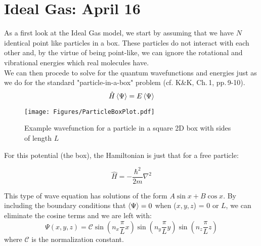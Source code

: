 \section{Ideal Gas: April 16}
As a first look at the Ideal Gas model, we start by assuming that we have $N$ identical point like particles in a box. These particles do not interact with each other and, by the virtue of being point-like, we can ignore the rotational and vibrational energies which real molecules have.\\

We can then procede to solve for the quantum wavefunctions and energies just as we do for the standard "particle-in-a-box" problem (cf. K\&K, Ch.\,1, pp.\,9-10).
\begin{equation}
\hat{H} \Braket{\Psi} = E \Braket{\Psi}
\end{equation}

\begin{figure}[h]
\centering
\texttt{[image: Figures/ParticleBoxPlot.pdf]}
\caption{Example wavefunction for a particle in a square 2D box 
	with sides of length $L$}
\end{figure}

For this potential (the box), the Hamiltonian is just that for a free 
particle:

\begin{equation}
\hat{H} = -\frac{\hbar^2}{2 m} \nabla^2
\end{equation}

This type of wave equation has solutions of the form $A \sin{x} + B \cos{x}$.
By including the boundary conditions that $\Braket{\Psi} = 0$ when
($x, y, z$) = $0$ or $L$, we can eliminate the cosine terms and we are left
with:
\begin{equation}
\Psi(x,y,z) = \mathcal{C} \sin(n_x \frac{\pi}{L} x) \sin(n_y \frac{\pi}{L} y) \sin(n_z \frac{\pi}{L} z)
\end{equation}
where $\mathcal{C}$ is the normalization constant.